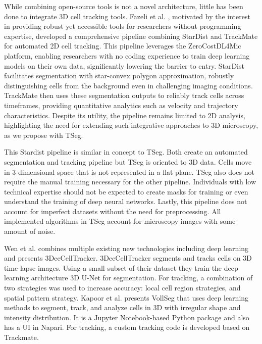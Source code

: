\documentclass[./dissertation.tex]{subfiles}
\begin{document}
While combining open-source tools is not a novel architecture, little has been done to integrate 3D cell tracking tools. Fazeli et al. \cite{fazeli2020automated}, motivated by the interest in providing robust yet accessible tools for researchers without programming expertise, developed a comprehensive pipeline combining StarDist \cite{Weigert_2020} and TrackMate \cite{TINEVEZ201780} for automated 2D cell tracking. This pipeline leverages the ZeroCostDL4Mic \cite{von2021democratising} platform, enabling researchers with no coding experience to train deep learning models on their own data, significantly lowering the barrier to entry. StarDist facilitates segmentation with star-convex polygon approximation, robustly distinguishing cells from the background even in challenging imaging conditions. TrackMate then uses these segmentation outputs to reliably track cells across timeframes, providing quantitative analytics such as velocity and trajectory characteristics. Despite its utility, the pipeline remains limited to 2D analysis, highlighting the need for extending such integrative approaches to 3D microscopy, as we propose with TSeg.

This Stardist pipeline is similar in concept to TSeg. Both create an automated segmentation and tracking pipeline but TSeg is oriented to 3D data. Cells move in 3-dimensional space that is not represented in a flat plane. TSeg also does not require the manual training necessary for the other pipeline. Individuals with low technical expertise should not be expected to create masks for training or even understand the training of deep neural networks. Lastly, this pipeline does not account for imperfect datasets without the need for preprocessing. All implemented algorithms in TSeg account for microscopy images with some amount of noise.

Wen et al. \cite{Wen2021-bn} combines multiple existing new technologies including deep learning and presents 3DeeCellTracker. 3DeeCellTracker segments and tracks cells on 3D time-lapse images. Using a small subset of their dataset they train the deep learning architecture 3D U-Net for segmentation. For tracking, a combination of two strategies was used to increase accuracy: local cell region strategies, and spatial pattern strategy. Kapoor et al. \cite{kapoor2021cell} presents VollSeg that uses deep learning methods to segment, track, and analyze cells in 3D with irregular shape and intensity distribution. It is a Jupyter Notebook-based Python package and also has a UI in Napari. For tracking, a custom tracking code is developed based on Trackmate.
\end{document}
